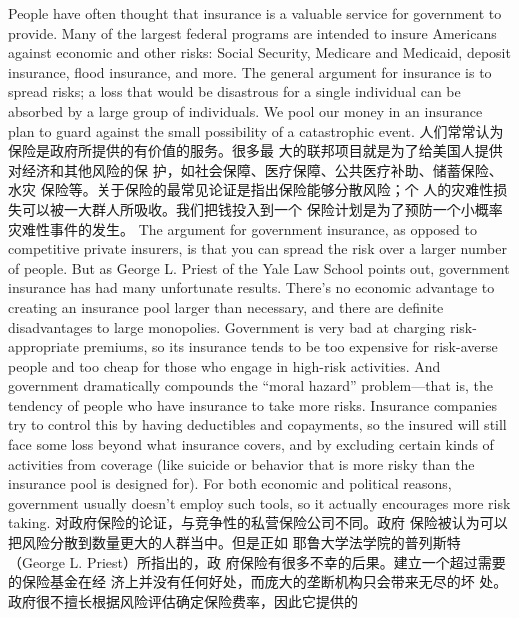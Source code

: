 \begin{paracol}{2}
People have often thought that insurance is a valuable service
for government to provide. Many of the largest federal programs are intended to insure Americans against economic and
other risks: Social Security, Medicare and Medicaid, deposit insurance, flood insurance, and more. The general argument for
insurance is to spread risks; a loss that would be disastrous for a
single individual can be absorbed by a large group of individuals. We pool our money in an insurance plan to guard against
the small possibility of a catastrophic event.
\switchcolumn
人们常常认为保险是政府所提供的有价值的服务。很多最
大的联邦项目就是为了给美国人提供对经济和其他风险的保
护，如社会保障、医疗保障、公共医疗补助、储蓄保险、水灾
保险等。关于保险的最常见论证是指出保险能够分散风险；个
人的灾难性损失可以被一大群人所吸收。我们把钱投入到一个
保险计划是为了预防一个小概率灾难性事件的发生。
\switchcolumn*
The argument for government insurance, as opposed to competitive private insurers, is that you can spread the risk over a
larger number of people. But as George L. Priest of the Yale
Law School points out, government insurance has had many
unfortunate results. There's no economic advantage to creating
an insurance pool larger than necessary, and there are definite
disadvantages to large monopolies. Government is very bad at
charging risk-appropriate premiums, so its insurance tends to
be too expensive for risk-averse people and too cheap for those
who engage in high-risk activities. And government dramatically compounds the ``moral hazard'' problem---that is, the tendency of people who have insurance to take more risks.
Insurance companies try to control this by having deductibles
and copayments, so the insured will still face some loss beyond
what insurance covers, and by excluding certain kinds of activities from coverage (like suicide or behavior that is more risky
than the insurance pool is designed for). For both economic and
political reasons, government usually doesn't employ such
tools, so it actually encourages more risk taking.
\switchcolumn
对政府保险的论证，与竞争性的私营保险公司不同。政府
保险被认为可以把风险分散到数量更大的人群当中。但是正如
耶鲁大学法学院的普列斯特（George L. Priest）所指出的，政
府保险有很多不幸的后果。建立一个超过需要的保险基金在经
济上并没有任何好处，而庞大的垄断机构只会带来无尽的坏
处。政府很不擅长根据风险评估确定保险费率，因此它提供的

\end{paracol}
